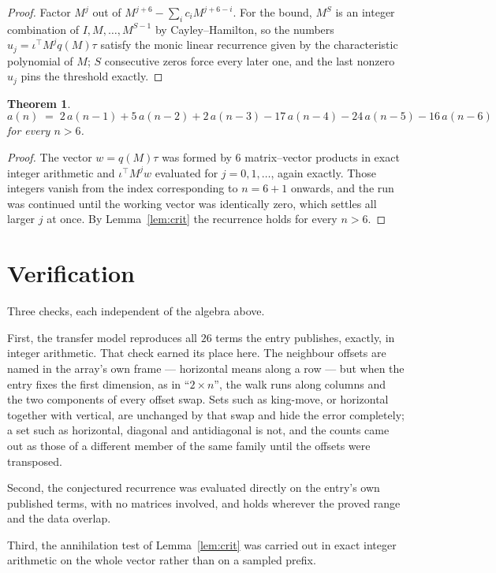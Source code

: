 \documentclass[11pt,a4paper]{article}
\theoremstyle{plain}
\newtheorem{theorem}{Theorem}
\theoremstyle{definition}
\begin{document}
\begin{proof}
Factor $M^{j}$ out of $M^{j+6}-\sum_ic_iM^{j+6-i}$. For the bound, $M^{S}$
is an integer combination of $I,M,\dots,M^{S-1}$ by Cayley--Hamilton, so the numbers
$u_j=\iota^{\!\top}M^{j}q(M)\tau$ satisfy the monic linear recurrence given by the
characteristic polynomial of $M$; $S$ consecutive zeros force every later one, and the last
nonzero $u_j$ pins the threshold exactly.
\end{proof}

\begin{theorem}
\[
a(n)\;=\;2\,a(n-1) + 5\,a(n-2) + 2\,a(n-3) - 17\,a(n-4) - 24\,a(n-5) - 16\,a(n-6)
\]
for every $n>6$.
\end{theorem}

\begin{proof}
The vector $w=q(M)\tau$ was formed by $6$ matrix--vector products in exact integer
arithmetic and $\iota^{\!\top}M^{j}w$ evaluated for $j=0,1,\dots$, again exactly. Those
integers vanish from the index corresponding to $n=6+1$ onwards, and the run was
continued until the working vector was identically zero, which settles all larger $j$ at once.
By Lemma~\ref{lem:crit} the recurrence holds for every $n>6$.
\end{proof}

\section{Verification}

Three checks, each independent of the algebra above.

First, the transfer model reproduces all $26$ terms the entry publishes, exactly, in
integer arithmetic. That check earned its place here. The neighbour offsets are named in the
array's own frame --- horizontal means along a row --- but when the entry fixes the first
dimension, as in ``$2\times n$'', the walk runs along columns and the two components of every
offset swap. Sets such as king-move, or horizontal together with vertical, are unchanged by
that swap and hide the error completely; a set such as horizontal, diagonal and antidiagonal
is not, and the counts came out as those of a different member of the same family until the
offsets were transposed.

Second, the conjectured recurrence was evaluated directly on the entry's own published terms,
with no matrices involved, and holds wherever the proved range and the data overlap.

Third, the annihilation test of Lemma~\ref{lem:crit} was carried out in exact integer
arithmetic on the whole vector rather than on a sampled prefix.
\end{document}
